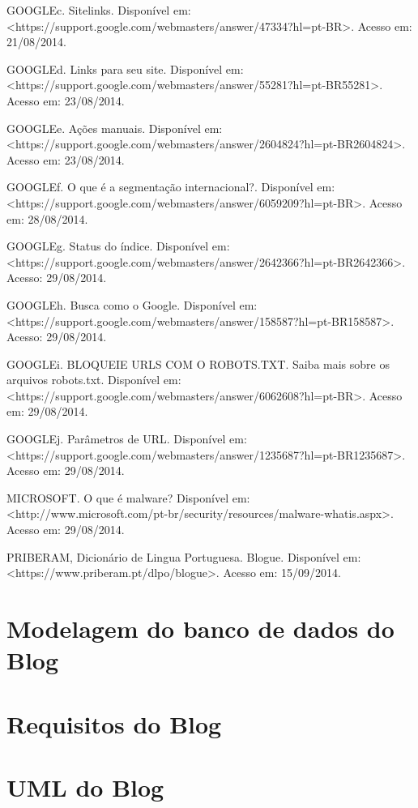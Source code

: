 \documentclass[
	12pt,				%
	openright,			%
	twoside,			%
	a4paper,			%
	english,			%
	french,				%
	spanish,			%
	brazil				%
	]{abntex2}
\begin{document}
GOOGLEc. Sitelinks. Disponível em: <https://support.google.com/webmasters/answer/47334?hl=pt-BR>. Acesso em: 21/08/2014.

GOOGLEd. Links para seu site. Disponível em: <https://support.google.com/webmasters/answer/55281?hl=pt-BR55281>. Acesso em: 23/08/2014.

GOOGLEe. Ações manuais. Disponível em: <https://support.google.com/webmasters/answer/2604824?hl=pt-BR2604824>. Acesso em: 23/08/2014.

GOOGLEf. O que é a segmentação internacional?. Disponível em: <https://support.google.com/webmasters/answer/6059209?hl=pt-BR>. Acesso em: 28/08/2014.

GOOGLEg. Status do índice. Disponível em: <https://support.google.com/webmasters/answer/2642366?hl=pt-BR2642366>. Acesso: 29/08/2014.

GOOGLEh. Busca como o Google. Disponível em: <https://support.google.com/webmasters/answer/158587?hl=pt-BR158587>. Acesso: 29/08/2014.

GOOGLEi. BLOQUEIE URLS COM O ROBOTS.TXT. Saiba mais sobre os arquivos robots.txt. Disponível em: <https://support.google.com/webmasters/answer/6062608?hl=pt-BR>. Acesso em: 29/08/2014.

GOOGLEj. Parâmetros de URL. Disponível em: <https://support.google.com/webmasters/answer/1235687?hl=pt-BR1235687>. Acesso em: 29/08/2014.

MICROSOFT. O que é malware? Disponível em: <http://www.microsoft.com/pt-br/security/resources/malware-whatis.aspx>. Acesso em: 29/08/2014.

PRIBERAM, Dicionário de Lingua Portuguesa. Blogue. Disponível em: <https://www.priberam.pt/dlpo/blogue>. Acesso em: 15/09/2014.


%
%



\begin{anexosenv}

\partanexos

\chapter{Modelagem do banco de dados do Blog}

\chapter{Requisitos do Blog}

\chapter{UML do Blog}

\end{anexosenv}

\printindex
\end{document}
